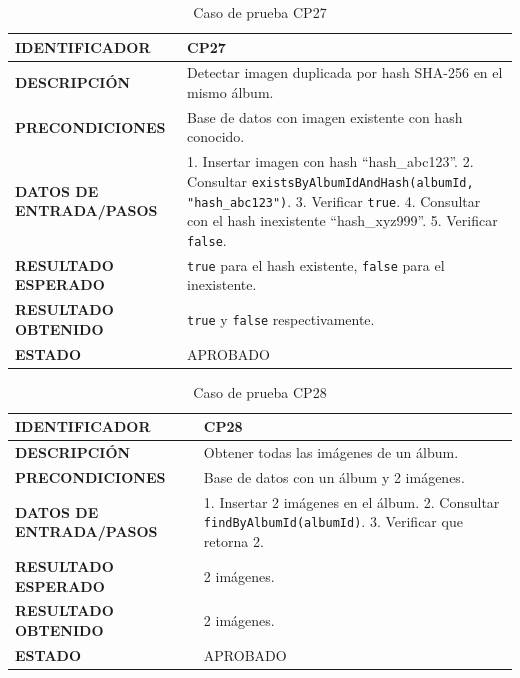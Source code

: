 \begin{table}[H]
\centering
\caption{Caso de prueba CP27}
\begin{tabular}{|p{3.5cm}|p{10.3cm}|}
\hline
\textbf{IDENTIFICADOR} & CP27 \\
\hline
\textbf{DESCRIPCIÓN} & Detectar imagen duplicada por hash SHA-256 en el mismo álbum. \\
\hline
\textbf{PRECONDICIONES} & Base de datos con imagen existente con hash conocido. \\
\hline
\textbf{DATOS DE ENTRADA/PASOS} & 1. Insertar imagen con hash ``hash\_abc123''. 2. Consultar \texttt{existsByAlbumIdAndHash(albumId, "hash\_abc123")}. 3. Verificar \texttt{true}. 4. Consultar con el hash inexistente ``hash\_xyz999''. 5. Verificar \texttt{false}. \\
\hline
\textbf{RESULTADO ESPERADO} & \texttt{true} para el hash existente, \texttt{false} para el inexistente. \\
\hline
\textbf{RESULTADO OBTENIDO} & \texttt{true} y \texttt{false} respectivamente. \\
\hline
\textbf{ESTADO} & APROBADO \\
\hline
\end{tabular}
\end{table}

\begin{table}[H]
\centering
\caption{Caso de prueba CP28}
\begin{tabular}{|p{3.5cm}|p{10.3cm}|}
\hline
\textbf{IDENTIFICADOR} & CP28 \\
\hline
\textbf{DESCRIPCIÓN} & Obtener todas las imágenes de un álbum. \\
\hline
\textbf{PRECONDICIONES} & Base de datos con un álbum y 2 imágenes. \\
\hline
\textbf{DATOS DE ENTRADA/PASOS} & 1. Insertar 2 imágenes en el álbum. 2. Consultar \texttt{findByAlbumId(albumId)}. 3. Verificar que retorna 2. \\
\hline
\textbf{RESULTADO ESPERADO} & 2 imágenes. \\
\hline
\textbf{RESULTADO OBTENIDO} & 2 imágenes. \\
\hline
\textbf{ESTADO} & APROBADO \\
\hline
\end{tabular}
\end{table}

